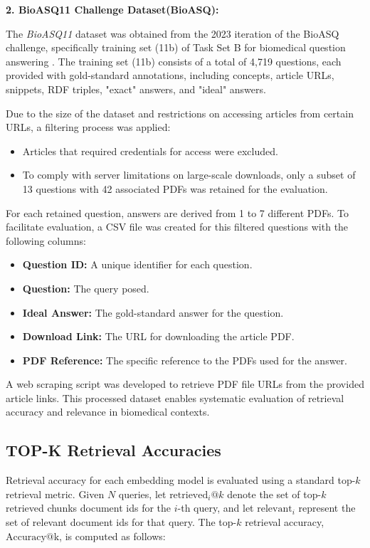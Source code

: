 \documentclass[pdflatex,sn-mathphys-num]{sn-jnl}%
\theoremstyle{thmstyleone}%
\theoremstyle{thmstyletwo}%
\theoremstyle{thmstylethree}%
\begin{document}
\textbf{2. BioASQ11 Challenge Dataset(BioASQ):}

The \textit{BioASQ11} dataset was obtained from the 2023 iteration of the BioASQ challenge, specifically training set (11b) of Task Set B for biomedical question answering \cite{bioasq2023}. The training set (11b) consists of a total of 4,719 questions, each provided with gold-standard annotations, including concepts, article URLs, snippets, RDF triples, "exact" answers, and "ideal" answers.

Due to the size of the dataset and restrictions on accessing articles from certain URLs, a filtering process was applied:
\begin{itemize}
    \item Articles that required credentials for access were excluded.
    \item To comply with server limitations on large-scale downloads, only a subset of 13 questions with 42 associated PDFs was retained for the evaluation.
\end{itemize}

For each retained question, answers are derived from 1 to 7 different PDFs. To facilitate evaluation, a CSV file was created for this filtered questions with the following columns:
\begin{itemize}
    \item \textbf{Question ID:} A unique identifier for each question.
    \item \textbf{Question:} The query posed.
    \item \textbf{Ideal Answer:} The gold-standard answer for the question.
    \item \textbf{Download Link:} The URL for downloading the article PDF.
    \item \textbf{PDF Reference:} The specific reference to the PDFs used for the answer.
\end{itemize}

A web scraping script was developed to retrieve PDF file URLs from the provided article links. This processed dataset enables systematic evaluation of retrieval accuracy and relevance in biomedical contexts.

\subsection{TOP-K Retrieval Accuracies}\label{sec4.2}

Retrieval accuracy for each embedding model is evaluated using a standard top-$k$ retrieval metric. Given $N$ queries, let $\text{retrieved}_i@k$ denote the set of top-$k$ retrieved chunks document ids for the $i$-th query, and let $\text{relevant}_i$ represent the set of relevant document ids for that query. The top-$k$ retrieval accuracy, $\text{Accuracy@k}$, is computed as follows:
\end{document}
